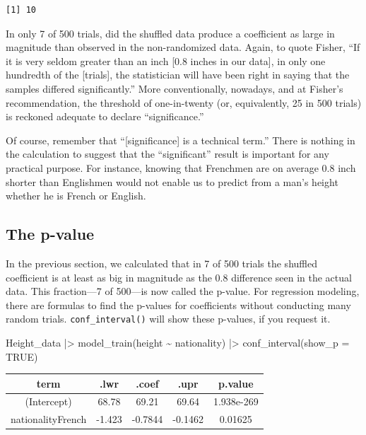 \documentclass[
  letterpaper,
  DIV=11,
  numbers=noendperiod,
  oneside]{scrartcl}
\newenvironment{Shaded}{\begin{snugshade}}{\end{snugshade}}
\newcommand{\AttributeTok}[1]{\textcolor[rgb]{0.40,0.45,0.13}{#1}}
\newcommand{\ConstantTok}[1]{\textcolor[rgb]{0.56,0.35,0.01}{#1}}
\newcommand{\FunctionTok}[1]{\textcolor[rgb]{0.28,0.35,0.67}{#1}}
\newcommand{\NormalTok}[1]{\textcolor[rgb]{0.00,0.23,0.31}{#1}}
\newcommand{\SpecialCharTok}[1]{\textcolor[rgb]{0.37,0.37,0.37}{#1}}
\begin{document}
\begin{verbatim}
[1] 10
\end{verbatim}

In only 7 of 500 trials, did the shuffled data produce a coefficient as
large in magnitude than observed in the non-randomized data. Again, to
quote Fisher, ``If it is very seldom greater than an inch {[}0.8 inches
in our data{]}, in only one hundredth of the {[}trials{]}, the
statistician will have been right in saying that the samples differed
significantly.'' More conventionally, nowadays, and at Fisher's
recommendation, the threshold of one-in-twenty (or, equivalently, 25 in
500 trials) is reckoned adequate to declare ``significance.''

Of course, remember that ``{[}significance{]} is a technical term.''
There is nothing in the calculation to suggest that the ``significant''
result is important for any practical purpose. For instance, knowing
that Frenchmen are on average 0.8 inch shorter than Englishmen would not
enable us to predict from a man's height whether he is French or
English.

\subsection{The p-value}\label{the-p-value}

In the previous section, we calculated that in 7 of 500 trials the
shuffled coefficient is at least as big in magnitude as the 0.8
difference seen in the actual data. This fraction---7 of 500---is now
called the p-value. For regression modeling, there are formulas to find
the p-values for coefficients without conducting many random trials.
\texttt{conf\_interval()} will show these p-values, if you request it.

\begin{Shaded}
\begin{Highlighting}[]
\NormalTok{Height\_data }\SpecialCharTok{|\textgreater{}} 
  \FunctionTok{model\_train}\NormalTok{(height }\SpecialCharTok{\textasciitilde{}}\NormalTok{ nationality) }\SpecialCharTok{|\textgreater{}}
  \FunctionTok{conf\_interval}\NormalTok{(}\AttributeTok{show\_p =} \ConstantTok{TRUE}\NormalTok{)}
\end{Highlighting}
\end{Shaded}

\begin{longtable}[]{@{}ccccc@{}}
\toprule\noalign{}
term & .lwr & .coef & .upr & p.value \\
\midrule\noalign{}
\endhead
\bottomrule\noalign{}
\endlastfoot
(Intercept) & 68.78 & 69.21 & 69.64 & 1.938e-269 \\
nationalityFrench & -1.423 & -0.7844 & -0.1462 & 0.01625 \\
\end{longtable}
\end{document}
